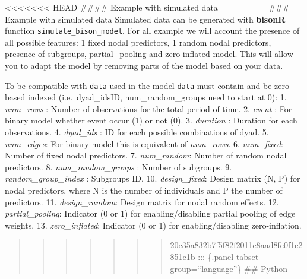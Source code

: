\documentclass[
  letterpaper,
  DIV=11,
  numbers=noendperiod]{scrartcl}
\begin{document}
\textless\textless\textless\textless\textless\textless\textless{} HEAD
\#\#\#\# Example with simulated data ======= \#\#\# Example with
simulated data Simulated data can be generated with \textbf{bisonR}
function \texttt{simulate\_bison\_model}. For all example we will
account the presence of all possible features: 1 fixed nodal predictors,
1 random nodal predictors, presence of subgroups, partial\_pooling and
zero inflated model. This will allow you to adapt the model by removing
parts of the model based on your data.

To be compatible with \texttt{data} used in the model \texttt{data} must
contain and be zero-based indexed (i.e.~dyad\_idsID, num\_random\_groups
need to start at 0): 1. \emph{num\_rows} : Number of observations for
the total period of time. 2. \emph{event} : For binary model whether
event occur (1) or not (0). 3. \emph{duration} : Duration for each
observations. 4. \emph{dyad\_ids} : ID for each possible combinations of
dyad. 5. \emph{num\_edges}: For binary model this is equivalent of
\emph{num\_rows}. 6. \emph{num\_fixed}: Number of fixed nodal
predictors. 7. \emph{num\_random}: Number of random nodal predictors. 8.
\emph{num\_random\_groups} : Number of subgroups. 9.
\emph{random\_group\_index} : Subgroups ID. 10. \emph{design\_fixed}:
Design matrix (N, P) for nodal predictors, where N is the number of
individuals and P the number of predictors. 11. \emph{design\_random}:
Design matrix for nodal random effects. 12. \emph{partial\_pooling}:
Indicator (0 or 1) for enabling/disabling partial pooling of edge
weights. 13. \emph{zero\_inflated}: Indicator (0 or 1) for
enabling/disabling zero-inflation.

\begin{quote}
\begin{quote}
\begin{quote}
\begin{quote}
\begin{quote}
\begin{quote}
\begin{quote}
20c35a832b7f5f82f2011e8aad8fe0f1e2851c1b ::: \{.panel-tabset
group=``language''\} \#\# Python
\end{quote}
\end{quote}
\end{quote}
\end{quote}
\end{quote}
\end{quote}
\end{quote}
\end{document}
